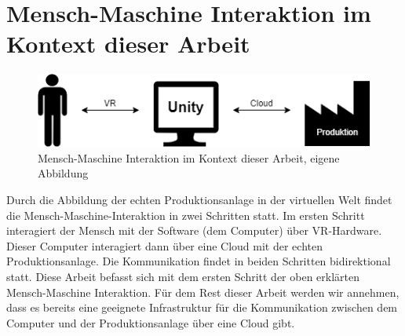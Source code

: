 \section{Mensch-Maschine Interaktion im Kontext dieser Arbeit}\label{sec:MMInteraktion}
\begin{figure}[h]
	\centering
	\includegraphics[width=0.7\linewidth]{Bilder/A19_MMI}
	\caption{Mensch-Maschine Interaktion im Kontext dieser Arbeit, eigene Abbildung}
	\label{fig:A}
\end{figure}
\noindent Durch die Abbildung der echten Produktionsanlage in der virtuellen Welt findet die Mensch-Maschine-Interaktion in zwei Schritten statt. Im ersten Schritt interagiert der Mensch mit der Software (dem Computer) über VR-Hardware. Dieser Computer interagiert dann über eine Cloud mit der echten Produktionsanlage. Die Kommunikation findet in beiden Schritten bidirektional statt.
\newline\newline
Diese Arbeit befasst sich mit dem ersten Schritt der oben erklärten Mensch-Maschine Interaktion. Für dem Rest dieser Arbeit werden wir annehmen, dass es bereits eine geeignete Infrastruktur für die Kommunikation zwischen dem Computer und der Produktionsanlage über eine Cloud gibt.

